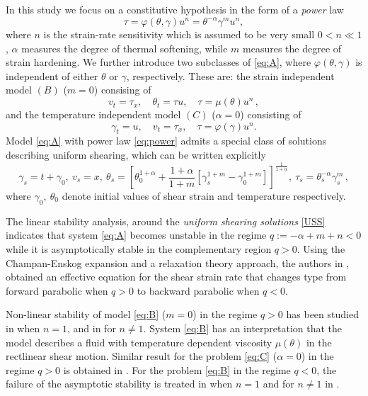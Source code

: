 \documentclass[graybox]{svmult}
\begin{document}
In this study we focus on a constitutive hypothesis in the form of a \emph{power} law 
\begin{equation}
 \tau = \varphi(\theta,\gamma)u^n = \theta^{-\alpha}\gamma^m u^n, \label{eq:power} 
\end{equation}
where $n$ is the strain-rate sensitivity which is assumed to be very small $0<n\ll1$, $\alpha$ measures the degree of thermal softening, while $m$ measures the degree of strain hardening. We further introduce two subclasses of \eqref{eq:A}, where $\varphi (\theta, \gamma)$ is independent 
of either $\theta$ or $\gamma$, respectively. These are: the strain independent model $(B)$ ($m = 0$)  consising of 
\begin{equation} \label{eq:B}\tag{B}
 v_t = \tau_x, \quad \theta_t = \tau u, \quad \tau = \mu(\theta)u^n 	\, , 	
\end{equation}
and the temperature independent model $(C)$ ($\alpha = 0$) consisting of
\begin{equation} \label{eq:C}\tag{C}
 \gamma_t = u, \quad  v_t = \tau_x, \quad \tau = \varphi(\gamma)u^n.			
\end{equation}
Model \eqref{eq:A} with power law \eqref{eq:power} admits a special class of solutions describing uniform shearing,  which can be written explicitly 
\begin{equation}
\label{USS}
 \gamma_s = t+\gamma_0, \ v_s=x, \ \theta_s=\left[\theta_0^{1+\alpha}+\frac{1+\alpha}{1+m}\left[ \gamma_s^{1+m} - \gamma_0^{1+m}\right] \right]^{\frac1{1+\alpha}}, \  \tau_s = \theta_s^{-\alpha}\gamma_s^m \, ,
\end{equation}
where $\gamma_0, \ \theta_0$ denote  initial values of shear strain and temperature respectively. 

The linear stability analysis, \cite{FM87} around the \emph{uniform shearing solutions} \eqref{USS} indicates that system \eqref{eq:A} becomes unstable in the regime 
$q:=-\alpha + m + n < 0$ while it is asymptotically stable in the complementary region $q > 0$. Using the Champan-Enskog expansion and a relaxation theory approach, the authors in \cite{KT09}, obtained an effective equation for the shear strain rate that changes type from forward parabolic when $q>0$ to backward parabolic when $q<0$. 

Non-linear stability of model \eqref{eq:B} ($m=0$) in the regime $q>0$ has been studied in \cite{dafermos_adiabatic_1983} when $n=1$, and in \cite{Tz_1986} for $n\ne1$. System \eqref{eq:B} has an interpretation that the model describes a fluid with temperature dependent viscosity $\mu(\theta)$ in the rectlinear shear motion. Similar result for the problem \eqref{eq:C} ($\alpha=0$) in the regime $q>0$  is obtained in \cite{tzavaras_nonlinear_1992}. For the problem \eqref{eq:B} in the regime $q<0$, the failure of the asymptotic stability is treated in \cite{bertsch_effect_1991} when $n=1$ and for $n\ne1$ in \cite{KT09}.  
\end{document}
